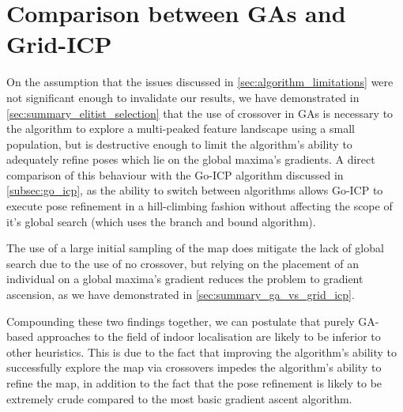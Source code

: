 \documentclass[authoryearcitations]{UoYCSproject}
\begin{document}
\section{Comparison between GAs and Grid-ICP}
\label{sec:summary_ga_vs_grid_icp}
On the assumption that the issues discussed in \autoref{sec:algorithm_limitations} were not significant enough to invalidate our results, we have demonstrated in \autoref{sec:summary_elitist_selection} that the use of crossover in GAs is necessary to the algorithm to explore a multi-peaked feature landscape using a small population, but is destructive enough to limit the algorithm's ability to adequately refine poses which lie on the global maxima's gradients. A direct comparison of this behaviour with the Go-ICP algorithm discussed in \autoref{subsec:go_icp}, as the ability to switch between algorithms allows Go-ICP to execute pose refinement in a hill-climbing fashion without affecting the scope of it's global search (which uses the branch and bound algorithm).\newline

The use of a large initial sampling of the map does mitigate the lack of global search due to the use of no crossover, but relying on the placement of an individual on a global maxima's gradient reduces the problem to gradient ascension, as we have demonstrated in \autoref{sec:summary_ga_vs_grid_icp}. \newline

Compounding these two findings together, we can postulate that purely GA-based approaches to the field of indoor localisation are likely to be inferior to other heuristics. This is due to the fact that improving the algorithm's ability to successfully explore the map via crossovers impedes the algorithm's ability to refine the map, in addition to the fact that the pose refinement is likely to be extremely crude compared to the most basic gradient ascent algorithm. \newline
\end{document}
